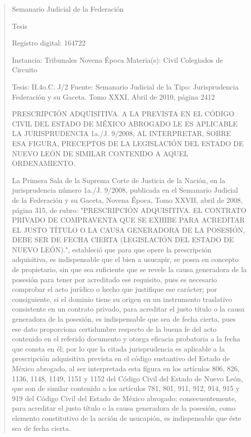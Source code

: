 \documentclass[11pt,a4paper]{article}
\begin{document}
\begin{quote}
                                                   Semanario Judicial de la Federación

                                                  Tesis

 Registro digital: 164722

 Instancia: Tribunales            Novena Época                         Materia(s): Civil
 Colegiados de Circuito

 Tesis: II.4o.C. J/2              Fuente: Semanario Judicial de la     Tipo: Jurisprudencia
                                  Federación y su Gaceta.
                                  Tomo XXXI, Abril de 2010, página
                                  2412


PRESCRIPCIÓN ADQUISITIVA. A LA PREVISTA EN EL CÓDIGO CIVIL DEL ESTADO DE
MÉXICO ABROGADO LE ES APLICABLE LA JURISPRUDENCIA 1a./J. 9/2008, AL
INTERPRETAR, SOBRE ESA FIGURA, PRECEPTOS DE LA LEGISLACIÓN DEL ESTADO DE
NUEVO LEÓN DE SIMILAR CONTENIDO A AQUEL ORDENAMIENTO.


La Primera Sala de la Suprema Corte de Justicia de la Nación, en la jurisprudencia número 1a./J.
9/2008, publicada en el Semanario Judicial de la Federación y su Gaceta, Novena Época, Tomo
XXVII, abril de 2008, página 315, de rubro: "PRESCRIPCIÓN ADQUISITIVA. EL CONTRATO
PRIVADO DE COMPRAVENTA QUE SE EXHIBE PARA ACREDITAR EL JUSTO TÍTULO O LA
CAUSA GENERADORA DE LA POSESIÓN, DEBE SER DE FECHA CIERTA (LEGISLACIÓN DEL
ESTADO DE NUEVO LEÓN).", estableció que para que opere la prescripción adquisitiva, es
indispensable que el bien a usucapir, se posea en concepto de propietario, sin que sea suficiente
que se revele la causa generadora de la posesión para tener por acreditado ese requisito, pues es
necesario comprobar el acto jurídico o hecho que justifique ese carácter; por consiguiente, si el
dominio tiene su origen en un instrumento traslativo consistente en un contrato privado, para
acreditar el justo título o la causa generadora de la posesión, es indispensable que sea de fecha
cierta, pues ese dato proporciona certidumbre respecto de la buena fe del acto contenido en el
referido documento y otorga eficacia probatoria a la fecha que consta en él; por lo que la citada
jurisprudencia es aplicable a la prescripción adquisitiva prevista en el código sustantivo del Estado
de México abrogado, al ser interpretada esta figura en los artículos 806, 826, 1136, 1148, 1149,
1151 y 1152 del Código Civil del Estado de Nuevo León, que son de similar contenido a los artículos
781, 801, 911, 912, 914, 915 y 919 del Código Civil del Estado de México abrogado;
consecuentemente, para acreditar el justo título o la causa generadora de la posesión, como
elemento constitutivo de la acción de usucapión, es indispensable que éste sea de fecha cierta.


\end{quote}
\end{document}
